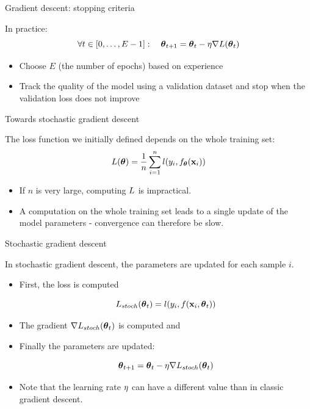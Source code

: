 \documentclass[xcolor=pdftex,dvipsnames,table,mathserif,aspectratio=169]{beamer}
\begin{document}
\begin{frame}{Gradient descent: stopping criteria}

  In practice:
  \[
  \forall t \in [0, \ldots, E-1]:\quad \boldsymbol{\theta}_{t+1} = \boldsymbol{\theta}_t - \eta \nabla L(\boldsymbol{\theta}_t)
  \]

  \begin{itemize}
  \item Choose $E$ (the number of \alert{epochs}) based on experience
  \item Track the quality of the model using a validation dataset and stop when the validation loss does not improve
  \end{itemize}


\end{frame}
\begin{frame}{Towards stochastic gradient descent}

  The loss function we initially defined depends on the whole training set:
  \[
  L(\boldsymbol{\theta}) = \frac{1}{n} \sum\limits_{i=1}^n l(y_i, f_{\boldsymbol{\theta}}(\mathbf{x}_i))
  \]

  \pause

  \begin{itemize}[<+->]
  \item If $n$ is very large, computing $L$ is impractical.
  \item A computation on the whole training set leads to a single update of the model parameters - convergence can therefore be slow.
  \end{itemize}

\end{frame}



\begin{frame}{Stochastic gradient descent}

  In \alert{stochastic gradient descent}, the parameters are updated for each sample $i$.

  \begin{itemize}[<+->]
  \item
    First, the loss is computed

    \[
    L_{stoch}(\boldsymbol{\theta}_t) = l(y_i, f(\mathbf{x}_i, \boldsymbol{\theta}_t))
    \]
  \item
    The gradient $\nabla L_{stoch}(\boldsymbol{\theta}_t)$ is computed and
  \item Finally the parameters are updated:

    \[
    \boldsymbol{\theta}_{t+1} = \boldsymbol{\theta}_t - \eta\nabla L_{stoch}(\boldsymbol{\theta}_t)
    \]
  \item
    Note that the learning rate $\eta$ can have a different value than in classic gradient descent.
  \end{itemize}

\end{frame}
\end{document}
